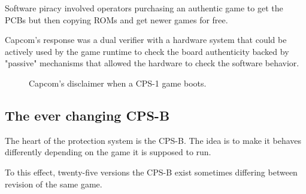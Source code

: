 Software piracy involved operators purchasing an authentic game to get the PCBs but then copying ROMs and get newer games for free. 

Capcom's response was a dual verifier with a hardware system that could be actively used by the game runtime to check the board authenticity backed by "passive" mechanisms that allowed the hardware to check the software behavior.

\begin{figure}[H]
\caption*{Capcom's disclaimer when a CPS-1 game boots.}
\end{figure}

\subsection{The ever changing CPS-B}
The heart of the protection system is the CPS-B. The idea is to make it behaves differently depending on the game it is supposed to run.

To this effect, twenty-five versions the CPS-B exist\cite{mame_cps1_video} sometimes differing between revision of the same game\cite{cpsBNumbers}.


